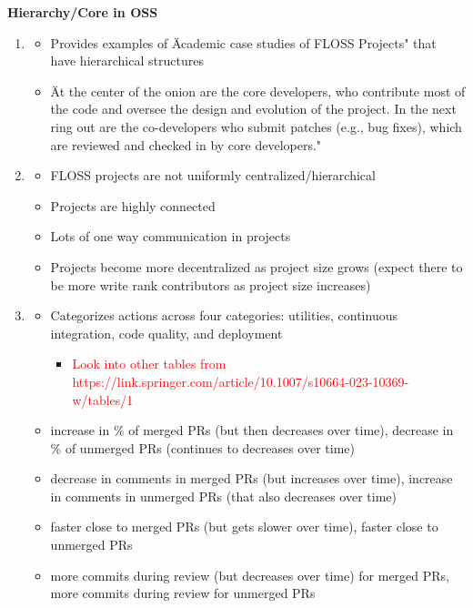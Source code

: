\documentclass[12pt,notitlepage]{article}
\begin{document}
\textbf{Hierarchy/Core in OSS}
\begin{enumerate}
    \item \cite{crowston_core_2006}
    \begin{itemize}
        \item Provides examples of \"Academic case studies of FLOSS Projects" that have hierarchical structures
        \item \"At the center of the onion are the core developers, who contribute most of the code and oversee the design and evolution of the project. In the next ring out are the co-developers who submit patches (e.g., bug fixes), which are reviewed and checked in by core developers."
    \end{itemize}
    \item \cite{crowston_hierarchy_2006}
    \begin{itemize}
        \item FLOSS projects are not uniformly centralized/hierarchical
        \item Projects are highly connected
        \item Lots of one way communication in projects
        \item Projects become more decentralized as project size grows (expect there to be more write rank contributors as project size increases)
    \end{itemize}
    \item \cite{wessel_github_2023}
    \begin{itemize}
        \item Categorizes actions across four categories: utilities, continuous integration, code quality, and deployment
        \begin{itemize}
            \item \textcolor{red}{Look into other tables from https://link.springer.com/article/10.1007/s10664-023-10369-w/tables/1}
        \end{itemize}
        \item increase in \% of merged PRs (but then decreases over time), decrease in \% of unmerged PRs (continues to decreases over time) 
        \item decrease in comments in merged PRs (but increases over time), increase in comments in unmerged PRs (that also decreases over time) 
        \item faster close to merged PRs (but gets slower over time), faster close to unmerged PRs 
        \item more commits during review (but decreases over time) for merged PRs, more commits during review for unmerged PRs

\end{itemize}
\end{enumerate}
\end{document}
